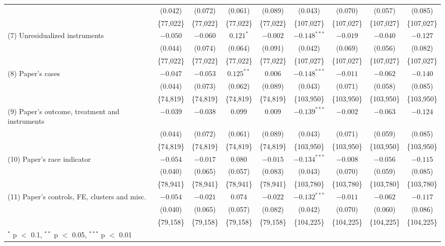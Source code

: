 \begin{tabular}{lcccccccc}
 & (0.042) & (0.072) & (0.061) & (0.089) & (0.043) & (0.070) & (0.057) & (0.085) \\
 & \{77,022\} & \{77,022\} & \{77,022\} & \{77,022\} & \{107,027\} & \{107,027\} & \{107,027\} & \{107,027\} \\
(7) Unresidualized instruments & $-0.050$ & $-0.060$ & $0.121^{*}$ & $-0.002$ & $-0.148^{***}$ & $-0.019$ & $-0.040$ & $-0.127$ \\
 & (0.044) & (0.074) & (0.064) & (0.091) & (0.042) & (0.069) & (0.056) & (0.082) \\
 & \{77,022\} & \{77,022\} & \{77,022\} & \{77,022\} & \{107,027\} & \{107,027\} & \{107,027\} & \{107,027\} \\
(8) Paper's cases & $-0.047$ & $-0.053$ & $0.125^{**}$ & $0.006$ & $-0.148^{***}$ & $-0.011$ & $-0.062$ & $-0.140$ \\
 & (0.044) & (0.073) & (0.062) & (0.089) & (0.043) & (0.071) & (0.058) & (0.085) \\
 & \{74,819\} & \{74,819\} & \{74,819\} & \{74,819\} & \{103,950\} & \{103,950\} & \{103,950\} & \{103,950\} \\
(9) Paper's outcome, treatment and instruments & $-0.039$ & $-0.038$ & $0.099$ & $0.009$ & $-0.139^{***}$ & $-0.002$ & $-0.063$ & $-0.124$ \\
 & (0.044) & (0.072) & (0.061) & (0.089) & (0.043) & (0.071) & (0.059) & (0.085) \\
 & \{74,819\} & \{74,819\} & \{74,819\} & \{74,819\} & \{103,950\} & \{103,950\} & \{103,950\} & \{103,950\} \\
(10) Paper's race indicator & $-0.054$ & $-0.017$ & $0.080$ & $-0.015$ & $-0.134^{***}$ & $-0.008$ & $-0.056$ & $-0.115$ \\
 & (0.040) & (0.065) & (0.057) & (0.083) & (0.043) & (0.070) & (0.059) & (0.085) \\
 & \{78,941\} & \{78,941\} & \{78,941\} & \{78,941\} & \{103,780\} & \{103,780\} & \{103,780\} & \{103,780\} \\
(11) Paper's controls, FE, clusters and misc. & $-0.054$ & $-0.021$ & $0.074$ & $-0.022$ & $-0.132^{***}$ & $-0.011$ & $-0.062$ & $-0.117$ \\
 & (0.040) & (0.065) & (0.057) & (0.082) & (0.042) & (0.070) & (0.060) & (0.086) \\
 & \{79,158\} & \{79,158\} & \{79,158\} & \{79,158\} & \{104,225\} & \{104,225\} & \{104,225\} & \{104,225\} \\
\bottomrule
\multicolumn{9}{l}{\footnotesize $^{*}$ p $<$ 0.1, $^{**}$ p $<$ 0.05, $^{***}$ p $<$ 0.01} \\
\end{tabular}
